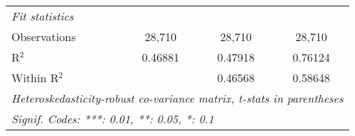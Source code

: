 \begin{tabular}{lccc}
   \midrule
   \emph{Fit statistics}\\
   Observations  & 28,710           & 28,710           & 28,710\\  
   R$^2$         & 0.46881          & 0.47918          & 0.76124\\  
   Within R$^2$  &                  & 0.46568          & 0.58648\\  
   \midrule \midrule
   \multicolumn{4}{l}{\emph{Heteroskedasticity-robust co-variance matrix, t-stats in parentheses}}\\
   \multicolumn{4}{l}{\emph{Signif. Codes: ***: 0.01, **: 0.05, *: 0.1}}\\
\end{tabular}
\par\endgroup


